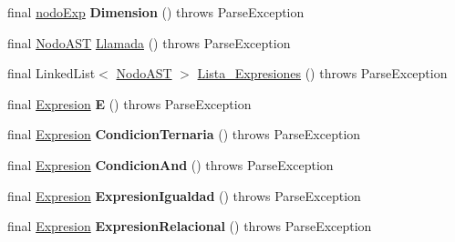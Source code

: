 \begin{DoxyCompactItemize}
\item 
\mbox{\label{classanalizadores_1_1_gramatica_ad2bacb82e3628dd63f0ba84c833d4a0f}} 
final \mbox{\hyperlink{classentorno_1_1nodo_exp}{nodo\+Exp}} {\bfseries Dimension} ()  throws Parse\+Exception 
\item 
final \mbox{\hyperlink{interfaceast_1_1_nodo_a_s_t}{Nodo\+A\+ST}} \mbox{\hyperlink{classanalizadores_1_1_gramatica_adaa40a87451a4f0a9817d6aa699a29cc}{Llamada}} ()  throws Parse\+Exception 
\item 
final Linked\+List$<$ \mbox{\hyperlink{interfaceast_1_1_nodo_a_s_t}{Nodo\+A\+ST}} $>$ \mbox{\hyperlink{classanalizadores_1_1_gramatica_a85cf71aa91bab6d5875a0333d6c8eaa3}{Lista\+\_\+\+Expresiones}} ()  throws Parse\+Exception 
\item 
\mbox{\label{classanalizadores_1_1_gramatica_a8665169171c61a43820eeb610185f2ef}} 
final \mbox{\hyperlink{interfaceast_1_1_expresion}{Expresion}} {\bfseries E} ()  throws Parse\+Exception 
\item 
\mbox{\label{classanalizadores_1_1_gramatica_ad179ebcc86755be93a364e113c57765a}} 
final \mbox{\hyperlink{interfaceast_1_1_expresion}{Expresion}} {\bfseries Condicion\+Ternaria} ()  throws Parse\+Exception 
\item 
\mbox{\label{classanalizadores_1_1_gramatica_abda840659e729a09678ee0da068f59b5}} 
final \mbox{\hyperlink{interfaceast_1_1_expresion}{Expresion}} {\bfseries Condicion\+And} ()  throws Parse\+Exception 
\item 
\mbox{\label{classanalizadores_1_1_gramatica_a4d9394b7ae237631915860ee463cbaf3}} 
final \mbox{\hyperlink{interfaceast_1_1_expresion}{Expresion}} {\bfseries Expresion\+Igualdad} ()  throws Parse\+Exception 
\item 
\mbox{\label{classanalizadores_1_1_gramatica_a3ccc93c791ea000a8c1505a37940346b}} 
final \mbox{\hyperlink{interfaceast_1_1_expresion}{Expresion}} {\bfseries Expresion\+Relacional} ()  throws Parse\+Exception 
\item 
\mbox{\label{classanalizadores_1_1_gramatica_ad5fc8095ad59a56e0337b9ecacde8895}} 

\end{DoxyCompactItemize}
